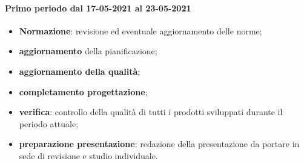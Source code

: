 \paragraph{Primo periodo dal 17-05-2021 al 23-05-2021}
\begin{itemize}
	\item \textbf{Normazione}: revisione ed eventuale aggiornamento delle norme;
	\item \textbf{aggiornamento} della pianificazione;
	\item \textbf{aggiornamento della qualità};
	\item \textbf{completamento progettazione};
	\item \textbf{verifica}: controllo della qualità di tutti i prodotti sviluppati durante il periodo attuale;
	\item \textbf{preparazione presentazione}: redazione della presentazione da portare in sede di revisione e
	studio individuale.
\end{itemize}